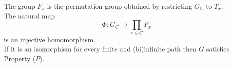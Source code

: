 \documentclass[preview]{standalone}
\begin{document}
The group $F_{x}$ is the permutation group obtained by restricting $G_{C}$ to $T_{x}$.\\The natural map \[\Phi : G_{C} \to \prod_{x \in C} F_{x}\] is an injective homomorphism.\\If it is an isomorphism for every finite and (bi)infinite path then $G$ satisfies Property ($P$).\\
\end{document}
